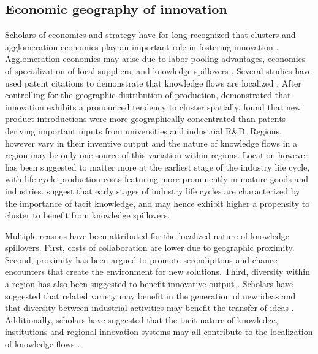 \documentclass[12pt,letterpaper]{article}
\begin{document}
\subsection{Economic geography of innovation}
Scholars of economics and strategy have for long recognized that clusters and agglomeration economies play an important role in fostering innovation \citep{Marshall1890, Porter1990}. Agglomeration economies may arise due to labor pooling advantages, economies of specialization of local suppliers, and knowledge spillovers \citep{Porter1990, Krugman1991a}.  Several studies have used patent citations to demonstrate that knowledge flows are localized \citep*{Jaffe1993, Almeida1999}. After controlling for the geographic distribution of production, \cite{Audretsch1996a} demonstrated that innovation exhibits a pronounced tendency to cluster spatially. \cite*{Acs1994} found that new product introductions were more geographically concentrated than patents deriving important inputs from universities and industrial R\&D. Regions, however vary in their inventive output \citep*{Agrawal2014b} and the nature of knowledge flows in a region may be only one source of this variation within regions. Location however has been suggested to matter more at the earliest stage of the industry life cycle, with life-cycle production costs featuring more prominently in mature goods and industries. \citep{Audretsch1996b} suggest that early stages of  industry life cycles are characterized by the importance of tacit knowledge, and may hence exhibit higher a propensity to cluster to benefit from knowledge spillovers. \par

Multiple reasons have been attributed for the localized nature of knowledge spillovers. First, costs of collaboration are lower due to geographic proximity. Second, proximity has been argued to promote serendipitous and chance encounters that create the environment for new solutions. Third, diversity within a region has also been suggested to benefit innovative output \citep{Feldman1999}. Scholars have suggested that related variety \citep*{Boschma2009, Frenken2007} may benefit in the generation of new ideas and that diversity between industrial activities may benefit the transfer of ideas \citep{Jacobs1969}. Additionally, scholars have suggested that the tacit nature of knowledge, institutions and regional innovation systems may all contribute to the localization of knowledge flows  \citep{Cooke1996, Maskell1999, Howells1996, Howells2002}.
\end{document}
